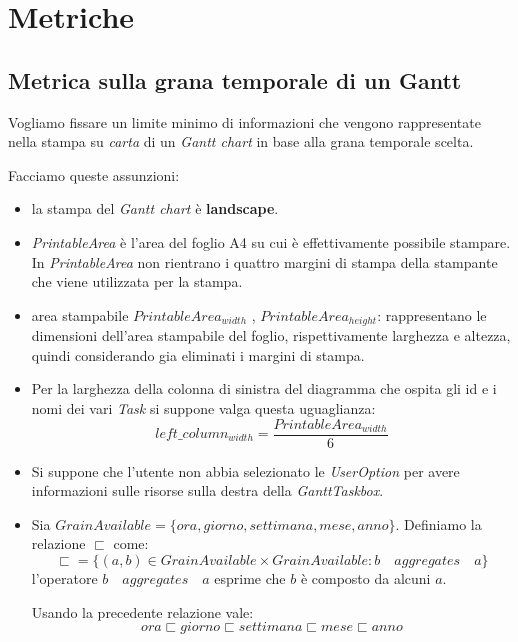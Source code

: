 \section{Metriche}

\subsection{Metrica sulla grana temporale di un Gantt}
Vogliamo fissare un limite minimo di informazioni che vengono rappresentate
nella stampa su \emph{carta} di un \emph{Gantt chart} in base alla grana
temporale scelta.

Facciamo queste assunzioni:
\begin{itemize}
  \item la stampa del \emph{Gantt chart} \`e \textbf{landscape}.
  \item \emph{PrintableArea} \`e l'area del foglio A4 su cui \`e effettivamente
  possibile stampare. In \emph{PrintableArea} non rientrano i quattro margini
  di stampa della stampante che viene utilizzata per la stampa.
  
  \item area stampabile $PrintableArea_{width}$ , $PrintableArea_{height}$:
  rappresentano le dimensioni dell'area stampabile del foglio, rispettivamente 
  larghezza e altezza, quindi considerando gia eliminati i margini di stampa.
  
  \item Per la larghezza della colonna di sinistra del diagramma che ospita gli
  id e i nomi dei vari \emph{Task} si suppone valga questa uguaglianza:
  \begin{displaymath}
  	left\_column_{width} = \frac{PrintableArea_{width}}{6}
  \end{displaymath}
  
   \item Si suppone che l'utente non abbia selezionato le \emph{UserOption} per
   avere informazioni sulle risorse sulla destra della \emph{GanttTaskbox}.

	\item Sia $GrainAvailable = \lbrace ora
	, giorno, settimana, mese, anno	\rbrace$. Definiamo la relazione $\sqsubset$
	come:
	\begin{displaymath}
	\sqsubset = \lbrace (a, b) \in GrainAvailable \times GrainAvailable : b \quad
	aggregates \quad a
	\rbrace
	\end{displaymath}
	l'operatore $b \quad aggregates \quad a$ esprime che $b$ \`e composto da alcuni
	$a$.
	
	Usando la precedente relazione vale:
	\begin{displaymath}
  	 ora \sqsubset giorno \sqsubset settimana \sqsubset mese \sqsubset anno
  	\end{displaymath}
\end{itemize}

